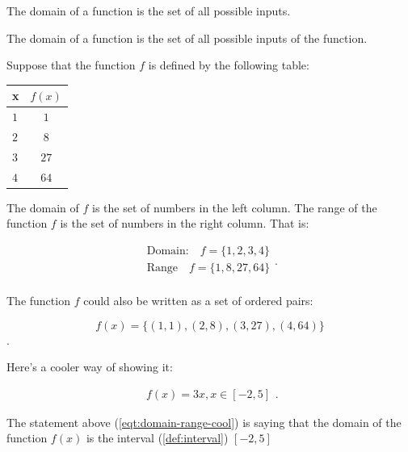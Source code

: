 \label{les_8_unit_1:domain_and_range_of_a_linear_function}

\begin{definition}[Domain]
  \label{def:domain}

  The domain of a function is the set of all possible inputs.
\end{definition}

\begin{definition}[Range]
  \label{def:range}

  The domain of a function is the set of all possible inputs of the function.
\end{definition}

\begin{example}
  \label{exm:domain}

  Suppose that the function $f$ is defined by the following table:

  \begin{center}
    \begin{tabular}{|l|c|}
      \hline
      x & $f(x)$ \\ \hline
      $1$ & $1$ \\ \hline
      $2$ & $8$ \\ \hline
      $3$ & $27$ \\ \hline
      $4$ & $64$ \\ \hline
    \end{tabular}
  \end{center}

  The domain of $f$ is the set of numbers in the left column. The range of the
  function $f$ is the set of numbers in the right column. That is:

  \begin{equation}
    \label{eqt:domain_range}
    \begin{split}
      \textrm{Domain:} \quad f = \{ 1, 2, 3, 4 \} \\
      \textrm{Range} \quad f = \{ 1, 8, 27, 64 \} \\
    \end{split}
  .\end{equation}

  The function $f$ 
  could also be written as a set of ordered pairs:

  \[ f(x) = \{(1, 1), (2, 8), (3, 27), (4, 64)\} \].

  Here's a cooler way of showing it:

  \begin{equation}
    \label{eqt:domain_range_cool}
    \begin{split}
      f(x) = 3x, x \in [-2, 5]
    \end{split}
  .\end{equation}

  The statement above (\ref{eqt:domain-range-cool}) is saying that the domain
  of the function $f(x)$ is the interval (\ref{def:interval}) $[-2, 5]$
\end{example}

